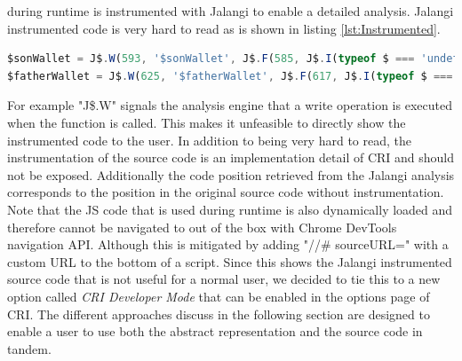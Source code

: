 during runtime is instrumented with Jalangi to enable a detailed analysis. Jalangi instrumented code is very hard to read as is shown in listing \ref{lst:Instrumented}.

\begin{lstlisting}[language=JavaScript, caption={Example of RxJS code.},label={lst:Instrumented}]
$sonWallet = J$.W(593, '$sonWallet', J$.F(585, J$.I(typeof $ === 'undefined' ? $ = J$.R(569, '$', undefined, true, true) : $ = J$.R(569, '$', $, true, true)), false)(J$.T(577, '#wallet-son', 21, false)), J$.I(typeof $sonWallet === 'undefined' ? undefined : $sonWallet), true, true);
$fatherWallet = J$.W(625, '$fatherWallet', J$.F(617, J$.I(typeof $ === 'undefined' ? $ = J$.R(601, '$', undefined, true, true) : $ = J$.R(601, '$', $, true, true)), false)(J$.T(609, '#wallet-father', 21, false)), J$.I(typeof $fatherWallet === 'undefined' ? undefined : $fatherWallet), true, true);
\end{lstlisting}

For example "J\$.W" signals the analysis engine that a write operation is executed when the function is called. This makes it unfeasible to directly show the instrumented code to the user. In addition to being very hard to read, the instrumentation of the source code is an implementation detail of CRI and should not be exposed. Additionally the code position retrieved from the Jalangi analysis corresponds to the position in the original source code without instrumentation. Note that the JS code that is used during runtime is also dynamically loaded and therefore cannot be navigated to out of the box with Chrome DevTools navigation API. Although this is mitigated by adding "//\# sourceURL=" with a custom URL to the bottom of a script. Since this shows the Jalangi instrumented source code that is not useful for a normal user, we decided to tie this to a new option called \emph{CRI Developer Mode} that can be enabled in the options page of CRI. The different approaches discuss in the following section are designed to enable a user to use both the abstract representation and the source code in tandem.
	
